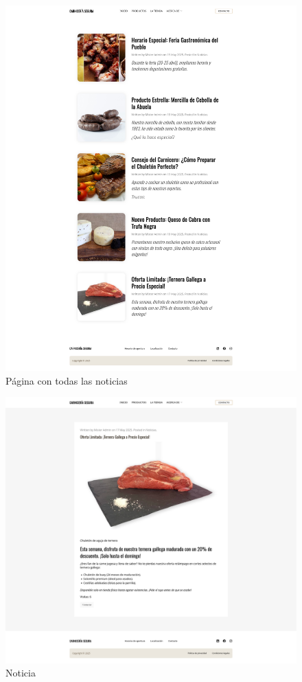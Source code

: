 \documentclass[a4paper]{article}
\begin{document}
\begin{figure}[H]
    \centering
    \includegraphics[width=1\textwidth]{images/template-2.png}
    \caption{Página con todas las noticias}
\end{figure}

\begin{figure}[H]
    \centering
    \includegraphics[width=1\textwidth]{images/template-3.png}
    \caption{Noticia}
\end{figure}
\end{document}
